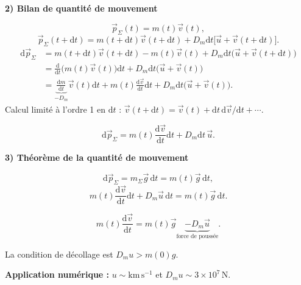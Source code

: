 \documentclass[11pt,a4paper]{article}
\newcommand{\dd}{\mathrm d}
\newcommand{\etape}[1]{\par\medskip\textbf{#1}\par\nopagebreak[4]}
\begin{document}
\begin{exemple}[breakable]
\begin{minipage}{\linewidth}
\begin{itemize}
\end{itemize}
\end{minipage}\par
\etape{2) Bilan de quantité de mouvement}
\[\vec p_\Sigma(t)=m(t)\vec v(t),\]
\[\vec p_\Sigma(t+\dd t)=m(t+\dd t)\vec v(t+\dd t)+D_m\dd t\bigl[\vec u+\vec v(t+\dd t)\bigr].\]
\begin{align*}
\dd\vec p_\Sigma&=m(t+\dd t)\vec v(t+\dd t)-m(t)\vec v(t)+D_m\dd t\bigl(\vec u+\vec v(t+\dd t)\bigr)\\
&=\frac{\dd}{\dd t}\bigl(m(t)\vec v(t)\bigr)\dd t+D_m\dd t\bigl(\vec u+\vec v(t)\bigr)\\
&=\underbrace{\frac{\dd m}{\dd t}}_{-D_m}\vec v(t)\dd t+m(t)\frac{\dd\vec v}{\dd t}\dd t+D_m\dd t\bigl(\vec u+\vec v(t)\bigr).
\end{align*}
Calcul limité à l'ordre 1 en $\dd t$ : $\vec v(t+\dd t)=\vec v(t)+\dd t\,\dd\vec v/\dd t+\cdots$.
\begin{cadre}\[\dd\vec p_\Sigma=m(t)\frac{\dd\vec v}{\dd t}\dd t+D_m\dd t\,\vec u.\]\end{cadre}
\etape{3) Théorème de la quantité de mouvement}
\[\dd\vec p_\Sigma=m_\Sigma\vec g\,\dd t=m(t)\vec g\,\dd t,\]
\[m(t)\frac{\dd\vec v}{\dd t}\dd t+D_m\vec u\,\dd t=m(t)\vec g\,\dd t.\]
\begin{cadre}\[m(t)\frac{\dd\vec v}{\dd t}=m(t)\vec g\underbrace{-D_m\vec u}_{\text{force de poussée}}.\]\end{cadre}
La condition de décollage est $D_m u>m(0)g$.
\par\medskip\noindent\textbf{Application numérique :} $u\sim\mathrm{km\,s^{-1}}$ et $D_m u\sim3\times10^7\,\mathrm N$.
\end{exemple}
\end{document}
